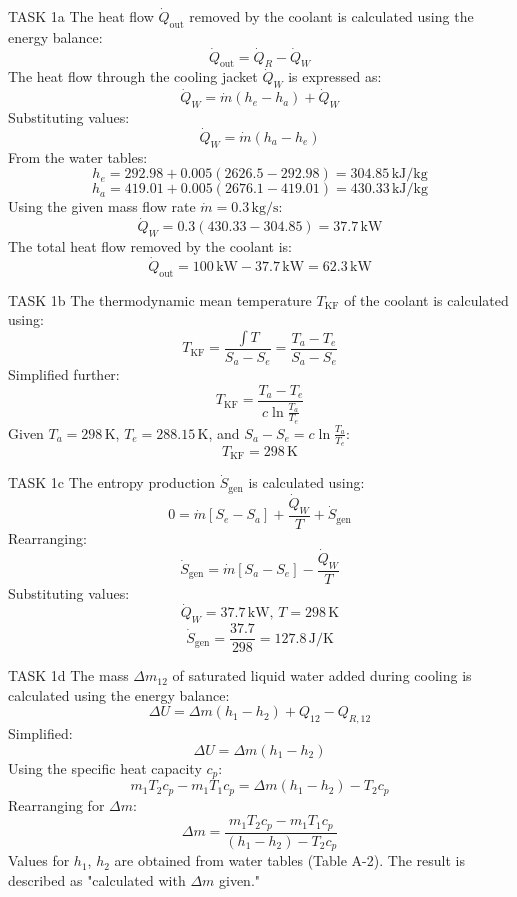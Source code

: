 TASK 1a  
The heat flow \( \dot{Q}_{\text{out}} \) removed by the coolant is calculated using the energy balance:  
\[
\dot{Q}_{\text{out}} = \dot{Q}_R - \dot{Q}_W
\]  
The heat flow through the cooling jacket \( \dot{Q}_W \) is expressed as:  
\[
\dot{Q}_W = \dot{m} (h_e - h_a) + \dot{Q}_W
\]  
Substituting values:  
\[
\dot{Q}_W = \dot{m} (h_a - h_e)
\]  
From the water tables:  
\[
h_e = 292.98 + 0.005 (2626.5 - 292.98) = 304.85 \, \text{kJ/kg}
\]  
\[
h_a = 419.01 + 0.005 (2676.1 - 419.01) = 430.33 \, \text{kJ/kg}
\]  
Using the given mass flow rate \( \dot{m} = 0.3 \, \text{kg/s} \):  
\[
\dot{Q}_W = 0.3 (430.33 - 304.85) = 37.7 \, \text{kW}
\]  
The total heat flow removed by the coolant is:  
\[
\dot{Q}_{\text{out}} = 100 \, \text{kW} - 37.7 \, \text{kW} = 62.3 \, \text{kW}
\]  

TASK 1b  
The thermodynamic mean temperature \( T_{\text{KF}} \) of the coolant is calculated using:  
\[
T_{\text{KF}} = \frac{\int T}{S_a - S_e} = \frac{T_a - T_e}{S_a - S_e}
\]  
Simplified further:  
\[
T_{\text{KF}} = \frac{T_a - T_e}{c \ln \frac{T_a}{T_e}}
\]  
Given \( T_a = 298 \, \text{K} \), \( T_e = 288.15 \, \text{K} \), and \( S_a - S_e = c \ln \frac{T_a}{T_e} \):  
\[
T_{\text{KF}} = 298 \, \text{K}
\]  

TASK 1c  
The entropy production \( \dot{S}_{\text{gen}} \) is calculated using:  
\[
0 = \dot{m} [S_e - S_a] + \frac{\dot{Q}_W}{T} + \dot{S}_{\text{gen}}
\]  
Rearranging:  
\[
\dot{S}_{\text{gen}} = \dot{m} [S_a - S_e] - \frac{\dot{Q}_W}{T}
\]  
Substituting values:  
\[
\dot{Q}_W = 37.7 \, \text{kW}, \, T = 298 \, \text{K}
\]  
\[
\dot{S}_{\text{gen}} = \frac{37.7}{298} = 127.8 \, \text{J/K}
\]  

TASK 1d  
The mass \( \Delta m_{12} \) of saturated liquid water added during cooling is calculated using the energy balance:  
\[
\Delta U = \Delta m (h_1 - h_2) + Q_{12} - Q_{R,12}
\]  
Simplified:  
\[
\Delta U = \Delta m (h_1 - h_2)
\]  
Using the specific heat capacity \( c_p \):  
\[
m_1 T_2 c_p - m_1 T_1 c_p = \Delta m (h_1 - h_2) - T_2 c_p
\]  
Rearranging for \( \Delta m \):  
\[
\Delta m = \frac{m_1 T_2 c_p - m_1 T_1 c_p}{(h_1 - h_2) - T_2 c_p}
\]  
Values for \( h_1 \), \( h_2 \) are obtained from water tables (Table A-2). The result is described as "calculated with \( \Delta m \) given."